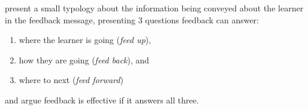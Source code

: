 \noindent \citet{hattie_power_2007} present a small typology about the information being conveyed about the learner in the feedback message, presenting 3 questions feedback can answer: 
\begin{enumerate}[itemsep=0.05em,label=(\roman*)]
    \item where the learner is going (\textit{feed up}), 
    \item how they are going (\textit{feed back}), and 
    \item where to next (\textit{feed forward})
\end{enumerate} 
and argue feedback is effective if it answers all three. 